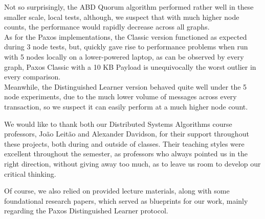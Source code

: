 \documentclass[sigconf]{acmart}
\begin{document}
Not so surprisingly, the ABD Quorum algorithm performed rather well in these smaller scale, local tests, although, we suspect that with much higher node counts, the performance would rapidly decrease across all graphs. \\

As for the Paxos implementations, the Classic version functioned as expected during 3 node tests, but, quickly gave rise to performance problems when run with 5 nodes locally on a lower-powered laptop, as can be observed by every graph, Paxos Classic with a 10 KB Payload is unequivocally the worst outlier in every comparison. \\
Meanwhile, the Distinguished Learner version behaved quite well under the 5 node experiments, due to the much lower volume of messages across every transaction, so we suspect it can easily perform at a much higher node count.

\begin{acks}
  We would like to thank both our Distributed Systems Algorithms course professors, João Leitão and Alexander Davidson, for their support throughout these projects, both during and outside of classes. Their teaching styles were excellent throughout the semester, as professors who always pointed us in the right direction, without giving away too much, as to leave us room to develop our critical thinking.
  
  Of course, we also relied on provided lecture materials, along with some foundational research papers, which served as blueprints for our work, mainly regarding the Paxos Distinguished Learner protocol.
\end{acks}



\nocite{*}
\end{document}

